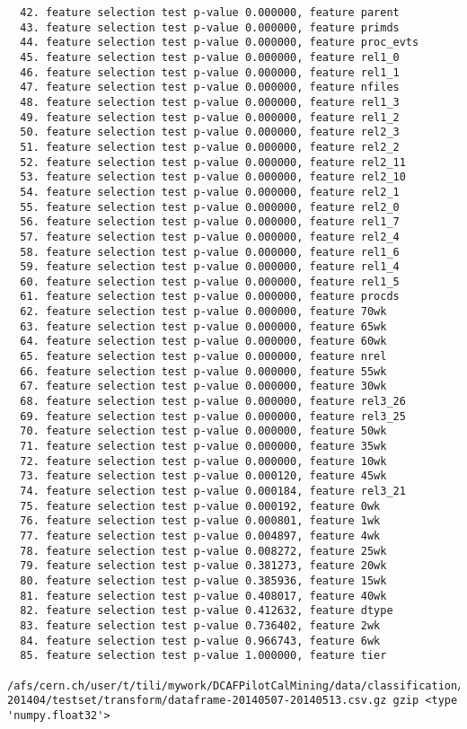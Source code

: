 \begin{verbatim}
  42. feature selection test p-value 0.000000, feature parent
  43. feature selection test p-value 0.000000, feature primds
  44. feature selection test p-value 0.000000, feature proc_evts
  45. feature selection test p-value 0.000000, feature rel1_0
  46. feature selection test p-value 0.000000, feature rel1_1
  47. feature selection test p-value 0.000000, feature nfiles
  48. feature selection test p-value 0.000000, feature rel1_3
  49. feature selection test p-value 0.000000, feature rel1_2
  50. feature selection test p-value 0.000000, feature rel2_3
  51. feature selection test p-value 0.000000, feature rel2_2
  52. feature selection test p-value 0.000000, feature rel2_11
  53. feature selection test p-value 0.000000, feature rel2_10
  54. feature selection test p-value 0.000000, feature rel2_1
  55. feature selection test p-value 0.000000, feature rel2_0
  56. feature selection test p-value 0.000000, feature rel1_7
  57. feature selection test p-value 0.000000, feature rel2_4
  58. feature selection test p-value 0.000000, feature rel1_6
  59. feature selection test p-value 0.000000, feature rel1_4
  60. feature selection test p-value 0.000000, feature rel1_5
  61. feature selection test p-value 0.000000, feature procds
  62. feature selection test p-value 0.000000, feature 70wk
  63. feature selection test p-value 0.000000, feature 65wk
  64. feature selection test p-value 0.000000, feature 60wk
  65. feature selection test p-value 0.000000, feature nrel
  66. feature selection test p-value 0.000000, feature 55wk
  67. feature selection test p-value 0.000000, feature 30wk
  68. feature selection test p-value 0.000000, feature rel3_26
  69. feature selection test p-value 0.000000, feature rel3_25
  70. feature selection test p-value 0.000000, feature 50wk
  71. feature selection test p-value 0.000000, feature 35wk
  72. feature selection test p-value 0.000000, feature 10wk
  73. feature selection test p-value 0.000120, feature 45wk
  74. feature selection test p-value 0.000184, feature rel3_21
  75. feature selection test p-value 0.000192, feature 0wk
  76. feature selection test p-value 0.000801, feature 1wk
  77. feature selection test p-value 0.004897, feature 4wk
  78. feature selection test p-value 0.008272, feature 25wk
  79. feature selection test p-value 0.381273, feature 20wk
  80. feature selection test p-value 0.385936, feature 15wk
  81. feature selection test p-value 0.408017, feature 40wk
  82. feature selection test p-value 0.412632, feature dtype
  83. feature selection test p-value 0.736402, feature 2wk
  84. feature selection test p-value 0.966743, feature 6wk
  85. feature selection test p-value 1.000000, feature tier
  /afs/cern.ch/user/t/tili/mywork/DCAFPilotCalMining/data/classification/tier2/merge_conf_tier2_201305-201404/testset/transform/dataframe-20140507-20140513.csv.gz gzip <type 'numpy.float32'>


\end{verbatim}

